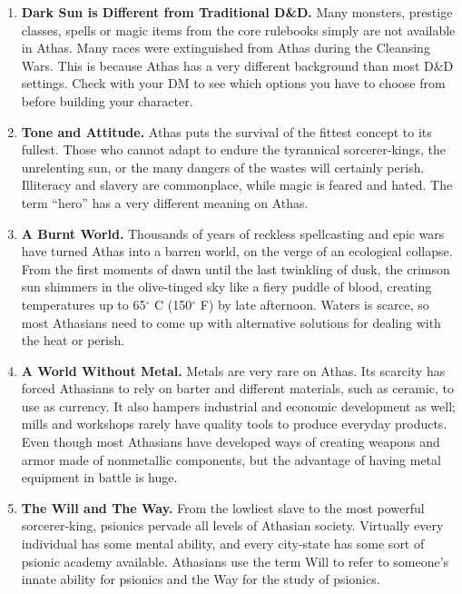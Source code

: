 \begin{enumerate}
\item \textbf{Dark Sun is Different from Traditional D\&D.} Many monsters, prestige classes, spells or magic items from the core rulebooks simply are not available in Athas. Many races were extinguished from Athas during the Cleansing Wars. This is because Athas has a very different background than most D\&D settings. Check with your DM to see which options you have to choose from before building your character.

\item \textbf{Tone and Attitude.} Athas puts the survival of the fittest concept to its fullest. Those who cannot adapt to endure the tyrannical sorcerer-kings, the unrelenting sun, or the many dangers of the wastes will certainly perish. Illiteracy and slavery are commonplace, while magic is feared and hated. The term ``hero'' has a very different meaning on Athas.

\item \textbf{A Burnt World.} Thousands of years of reckless spellcasting and epic wars have turned Athas into a barren world, on the verge of an ecological collapse. From the first moments of dawn until the last twinkling of dusk, the crimson sun shimmers in the olive-tinged sky like a fiery puddle of blood, creating temperatures up to 65$^\circ$ C (150$^\circ$ F) by late afternoon. Waters is scarce, so most Athasians need to come up with alternative solutions for dealing with the heat or perish.

\item \textbf{A World Without Metal.} Metals are very rare on Athas. Its scarcity has forced Athasians to rely on barter and different materials, such as ceramic, to use as currency. It also hampers industrial and economic development as well; mills and workshops rarely have quality tools to produce everyday products. Even though most Athasians have developed ways of creating weapons and armor made of nonmetallic components, but the advantage of having metal equipment in battle is huge.

\item \textbf{The Will and The Way.} From the lowliest slave to the most powerful sorcerer-king, psionics pervade all levels of Athasian society. Virtually every individual has some mental ability, and every city-state has some sort of psionic academy available. Athasians use the term Will to refer to someone's innate ability for psionics and the Way for the study of psionics.


\end{enumerate}
